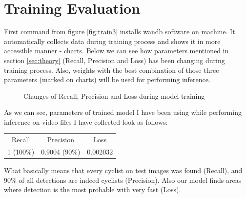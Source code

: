\section{Training Evaluation}
\label{sec:eval}
First command from figure \ref{fig:train3} installs wandb software on machine. It automatically collects data during training process and shows it in more accessible manner - charts. Below we can see how parameters mentioned in section \ref{sec:theory} (Recall, Precision and Loss) has been changing during training process. Also, weights with the best combination of those three parameters (marked on charts) will be used for performing inference.
\begin{figure} [h]
    \centering
    \caption{Changes of Recall, Precision and Loss during model training}
    \label{fig:eval1}
\end{figure}
\newline As we can see, parameters of trained model I have been using while performing inference on video files I have collected look as follows:
\begin{center}
    \begin{tabular}{ccc}
    Recall    & Precision     & Loss     \\
    1 (100\%) & 0.9004 (90\%) & 0.002032
    \end{tabular}
\end{center}
What basically means that every cyclist on test images was found (Recall), and 90\% of all detections are indeed cyclists (Precision). Also our model finds areas where detection is the most probable with very fast (Loss).

